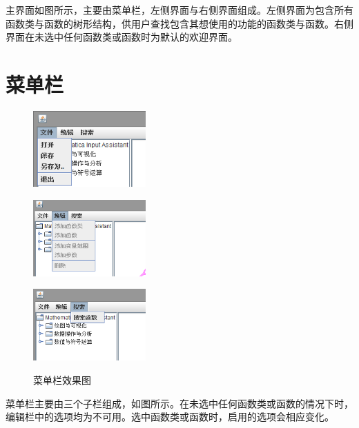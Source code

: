 \documentclass[hyperref, UTF8
,bookmarksnumbered=true, oneside]{ctexbook}
\begin{document}
		主界面如图所示，主要由菜单栏，左侧界面与右侧界面组成。左侧界面为包含所有函数类与函数的树形结构，供用户查找包含其想使用的功能的函数类与函数。右侧界面在未选中任何函数类或函数时为默认的欢迎界面。
		
	\section{菜单栏} %

		\begin{figure}[!h]
			\begin{minipage}[b]{0.3\textwidth}
			\centering
			\includegraphics[width=1.7in]{Menu1.png}
			\label{pic:MathPack}
			\end{minipage}%
			\hspace{0.025\textwidth}%
			\begin{minipage}[b]{0.3\textwidth}
			\centering
			\includegraphics[width=1.7in]{Menu2.png}
			\label{pic:GUIPack}
			\end{minipage}			
			\hspace{0.025\textwidth}%
			\begin{minipage}[b]{0.3\textwidth}
			\centering
			\includegraphics[width=1.7in]{Menu3.png}
			\label{pic:GUIPack}
			\end{minipage}
			\caption{菜单栏效果图}
		\end{figure}

		菜单栏主要由三个子栏组成，如图所示。在未选中任何函数类或函数的情况下时，编辑栏中的选项均为不可用。选中函数类或函数时，启用的选项会相应变化。
\end{document}
